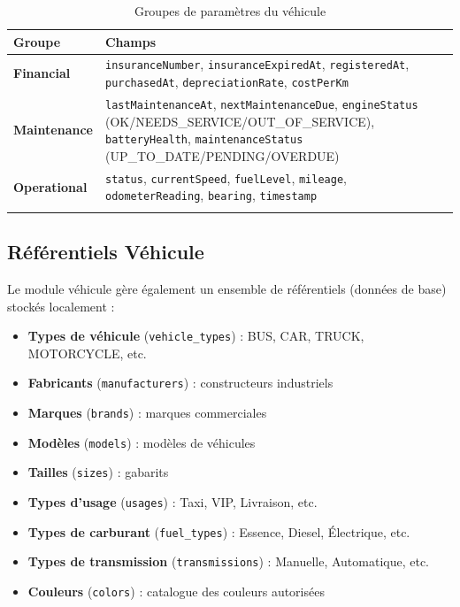 \documentclass[12pt,a4paper]{report}
\begin{document}
\begin{longtable}{p{3.5cm}p{9cm}}
\toprule
\textbf{Groupe} & \textbf{Champs} \\
\midrule
\endhead
\textbf{Financial} & \texttt{insuranceNumber}, \texttt{insuranceExpiredAt}, \texttt{registeredAt}, \texttt{purchasedAt}, \texttt{depreciationRate}, \texttt{costPerKm} \\
\textbf{Maintenance} & \texttt{lastMaintenanceAt}, \texttt{nextMaintenanceDue}, \texttt{engineStatus} (OK/NEEDS\_SERVICE/OUT\_OF\_SERVICE), \texttt{batteryHealth}, \texttt{maintenanceStatus} (UP\_TO\_DATE/PENDING/OVERDUE) \\
\textbf{Operational} & \texttt{status}, \texttt{currentSpeed}, \texttt{fuelLevel}, \texttt{mileage}, \texttt{odometerReading}, \texttt{bearing}, \texttt{timestamp} \\
\bottomrule
\caption{Groupes de paramètres du véhicule}
\end{longtable}

\subsection{Référentiels Véhicule}

Le module véhicule gère également un ensemble de référentiels (données de base) stockés localement :

\begin{itemize}[leftmargin=2cm]
  \item \textbf{Types de véhicule} (\texttt{vehicle\_types}) : BUS, CAR, TRUCK, MOTORCYCLE, etc.
  \item \textbf{Fabricants} (\texttt{manufacturers}) : constructeurs industriels
  \item \textbf{Marques} (\texttt{brands}) : marques commerciales
  \item \textbf{Modèles} (\texttt{models}) : modèles de véhicules
  \item \textbf{Tailles} (\texttt{sizes}) : gabarits
  \item \textbf{Types d'usage} (\texttt{usages}) : Taxi, VIP, Livraison, etc.
  \item \textbf{Types de carburant} (\texttt{fuel\_types}) : Essence, Diesel, Électrique, etc.
  \item \textbf{Types de transmission} (\texttt{transmissions}) : Manuelle, Automatique, etc.
  \item \textbf{Couleurs} (\texttt{colors}) : catalogue des couleurs autorisées
\end{itemize}
\end{document}
